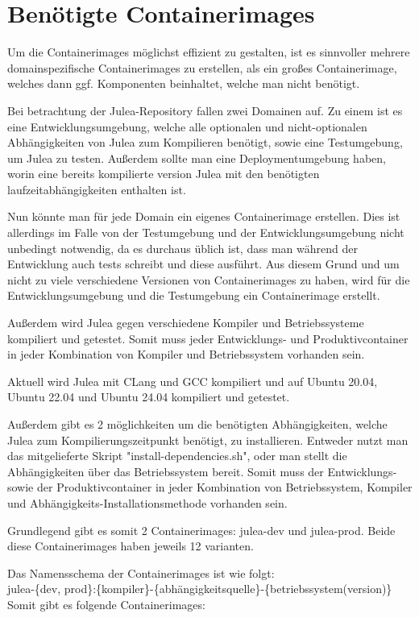 \section{Benötigte Containerimages}

Um die Containerimages möglichst effizient zu gestalten, ist es sinnvoller mehrere domainspezifische Containerimages zu erstellen, als ein großes Containerimage, welches dann ggf. Komponenten beinhaltet, welche man nicht benötigt.

Bei betrachtung der Julea-Repository fallen zwei Domainen auf. Zu einem ist es eine Entwicklungsumgebung, welche alle optionalen und nicht-optionalen Abhängigkeiten von Julea zum Kompilieren benötigt, sowie eine Testumgebung, um Julea zu testen. Außerdem sollte man eine Deploymentumgebung haben, worin eine bereits kompilierte version Julea mit den benötigten laufzeitabhängigkeiten enthalten ist.

Nun könnte man für jede Domain ein eigenes Containerimage erstellen. Dies ist allerdings im Falle von der Testumgebung und der Entwicklungsumgebung nicht unbedingt notwendig, da es durchaus üblich ist, dass man während der Entwicklung auch tests schreibt und diese ausführt. Aus diesem Grund und um nicht zu viele verschiedene Versionen von Containerimages zu haben, wird für die Entwicklungsumgebung und die Testumgebung ein Containerimage erstellt.

Außerdem wird Julea gegen verschiedene Kompiler und Betriebssysteme kompiliert und getestet. Somit muss jeder Entwicklungs- und Produktivcontainer in jeder Kombination von Kompiler und Betriebssystem vorhanden sein. 

Aktuell wird Julea mit CLang und GCC kompiliert und auf Ubuntu 20.04, Ubuntu 22.04 und Ubuntu 24.04 kompiliert und getestet.

Außerdem gibt es 2 möglichkeiten um die benötigten Abhängigkeiten, welche Julea zum Kompilierungszeitpunkt benötigt, zu installieren. Entweder nutzt man das mitgelieferte Skript "install-dependencies.sh", oder man stellt die Abhängigkeiten über das Betriebssystem bereit. Somit muss der Entwicklungs- sowie der Produktivcontainer in jeder Kombination von Betriebssystem, Kompiler und Abhängigkeits-Installationsmethode vorhanden sein.

Grundlegend gibt es somit 2 Containerimages: julea-dev und julea-prod. Beide diese Containerimages haben jeweils 12 varianten.

Das Namensschema der Containerimages ist wie folgt: \\
julea-\{dev, prod\}:\{kompiler\}-\{abhängigkeitsquelle\}-\{betriebssystem(version)\}
Somit gibt es folgende Containerimages:

